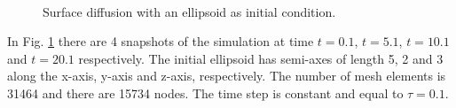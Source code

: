 \documentclass[a4paper,11pt, onecolumn]{article}
\begin{document}
\begin{figure}[htbp]
 \centering
 \quad
 \\
 \quad
 \caption{Surface diffusion with an ellipsoid as initial condition.}
 \label{fig:sd_ellipsoid}
\end{figure}

In Fig. \ref{fig:sd_ellipsoid} there are 4 snapshots of the simulation at time
$t=0.1$, $t=5.1$, $t=10.1$ and $t=20.1$ respectively. The initial ellipsoid has
semi-axes of length 5, 2 and 3 along the x-axis, y-axis and z-axis,
respectively. The number of mesh elements is 31464 and there are 15734 nodes.
The time step is constant and equal to $\tau=0.1$.
\newline
\end{document}
